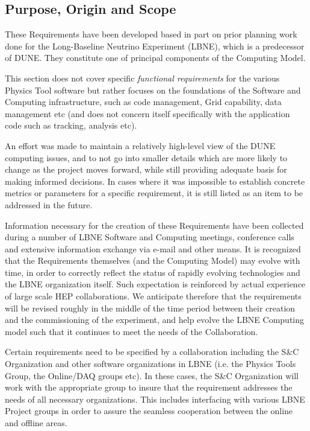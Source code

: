 \subsection{Purpose, Origin and Scope}

These Requirements have been developed based in part on prior planning work done for the Long-Baseline Neutrino Experiment (LBNE), which is a predecessor of DUNE.
They constitute one of principal components of the Computing Model. 

This section does not cover specific \textit{functional requirements} for the various Physics Tool software but rather focuses on the foundations of the Software and Computing infrastructure, such as code management, Grid capability, data management etc (and does not concern itself specifically with the application code such as tracking, analysis etc).

An effort was made to maintain a relatively high-level view of the DUNE computing issues, and to not go into smaller details which are more likely to change as the project moves forward, while still providing adequate basis for making informed decisions. In cases where it was impossible to establish concrete metrics or parameters for a specific requirement, it is still listed as an item
to be addressed in the future.

Information necessary for the creation of these Requirements have been collected during a number of LBNE Software and Computing meetings, conference calls and extensive information exchange via e-mail and other means. It is recognized that the Requirements themselves (and the Computing Model) may evolve with time, in order to correctly reflect the status of rapidly evolving technologies and the LBNE organization itself. Such expectation is reinforced by actual experience of large scale HEP collaborations. We anticipate therefore that the requirements will be revised roughly in the middle of the time period between their creation and the commissioning of the experiment, and help evolve the LBNE Computing model such that it continues to meet the needs of the Collaboration.

Certain  requirements need to be specified by a collaboration including the S\&C Organization and other software organizations in LBNE (i.e. the Physics Tools Group, the Online/DAQ groups etc). In these cases, the S\&C Organization will work with the appropriate group to insure that the requirement addresses the needs of all necessary organizations.  This includes interfacing with various LBNE Project groups in order to assure the seamless cooperation between the online and offline areas.
